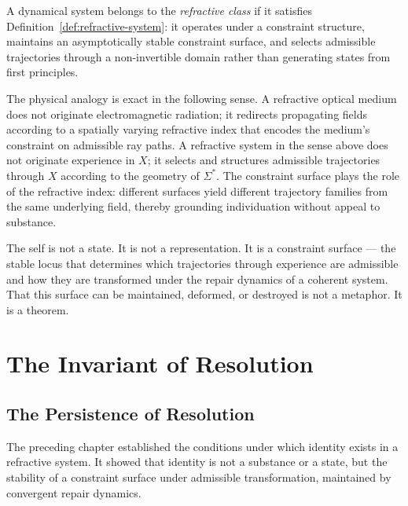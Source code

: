 \documentclass[11pt,openany]{book}
\begin{document}
A dynamical system belongs to the \emph{refractive class}
if it satisfies Definition~\ref{def:refractive-system}: it
operates under a constraint structure, maintains an
asymptotically stable constraint surface, and selects
admissible trajectories through a non-invertible domain
rather than generating states from first principles.

The physical analogy is exact in the following sense.  A
refractive optical medium does not originate electromagnetic
radiation; it redirects propagating fields according to a
spatially varying refractive index that encodes the medium's
constraint on admissible ray paths.  A refractive system in
the sense above does not originate experience in $X$; it
selects and structures admissible trajectories through $X$
according to the geometry of $\Sigma^*$.  The constraint
surface plays the role of the refractive index: different
surfaces yield different trajectory families from the same
underlying field, thereby grounding individuation without
appeal to substance.

The self is not a state.  It is not a representation.  It
is a constraint surface --- the stable locus that determines
which trajectories through experience are admissible and how
they are transformed under the repair dynamics of a coherent
system.  That this surface can be maintained, deformed, or
destroyed is not a metaphor.  It is a theorem.


\chapter{The Invariant of Resolution}
\label{ch:invariant-resolution}

\section*{ The Persistence of Resolution}

The preceding chapter established the conditions under which
identity exists in a refractive system.  It showed that
identity is not a substance or a state, but the stability
of a constraint surface under admissible transformation,
maintained by convergent repair dynamics.
\end{document}
